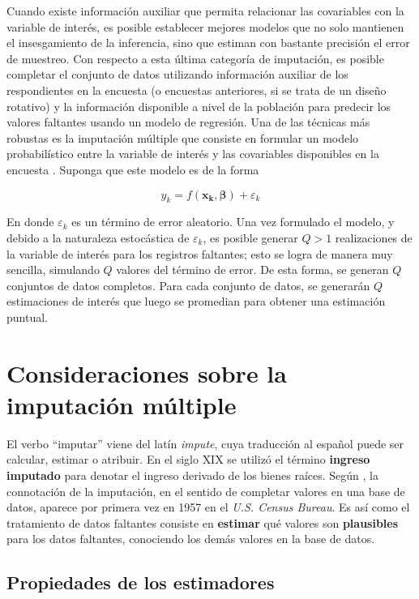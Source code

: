 \documentclass[
  10pt,
  spanish,
]{book}
\begin{document}
Cuando existe información auxiliar que permita relacionar las covariables con la variable de interés, es posible establecer mejores modelos que no solo mantienen el insesgamiento de la inferencia, sino que estiman con bastante precisión el error de muestreo. Con respecto a esta última categoría de imputación, es posible completar el conjunto de datos utilizando información auxiliar de los respondientes en la encuesta (o encuestas anteriores, si se trata de un diseño rotativo) y la información disponible a nivel de la población para predecir los valores faltantes usando un modelo de regresión. Una de las técnicas más robustas es la imputación múltiple que consiste en formular un modelo probabilístico entre la variable de interés y las covariables disponibles en la encuesta \citep{Rubin_1987}. Suponga que este modelo es de la forma

\[
y_k = f(\mathbf{x_k},\boldsymbol{\beta}) + \varepsilon_k 
\]

En donde \(\varepsilon_k\) es un término de error aleatorio. Una vez formulado el modelo, y debido a la naturaleza estocástica de \(\varepsilon_k\), es posible generar \(Q>1\) realizaciones de la variable de interés para los registros faltantes; esto se logra de manera muy sencilla, simulando \(Q\) valores del término de error. De esta forma, se generan \(Q\) conjuntos de datos completos. Para cada conjunto de datos, se generarán \(Q\) estimaciones de interés que luego se promedian para obtener una estimación puntual.

\hypertarget{consideraciones-sobre-la-imputaciuxf3n-muxfaltiple}{%
\section{Consideraciones sobre la imputación múltiple}\label{consideraciones-sobre-la-imputaciuxf3n-muxfaltiple}}

El verbo ``imputar'' viene del latín \emph{impute}, cuya traducción al español puede ser calcular, estimar o atribuir. En el siglo XIX se utilizó el término \textbf{ingreso imputado} para denotar el ingreso derivado de los bienes raíces. Según \citet{VanBuuren}, la connotación de la imputación, en el sentido de completar valores en una base de datos, aparece por primera vez en 1957 en el \emph{U.S. Census Bureau}. Es así como el tratamiento de datos faltantes consiste en \textbf{estimar} qué valores son \textbf{plausibles} para los datos faltantes, conociendo los demás valores en la base de datos.

\hypertarget{propiedades-de-los-estimadores}{%
\subsection{Propiedades de los estimadores}\label{propiedades-de-los-estimadores}}
\end{document}
